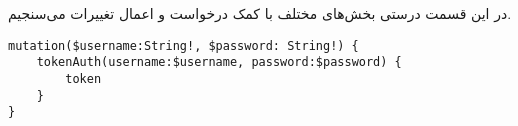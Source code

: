 
در این قسمت درستی بخش‌های مختلف  با کمک درخواست‌ و اعمال تغییرات  می‌سنجیم. 

	 


\begin{latin}
	\begin{verbatim}
mutation($username:String!, $password: String!) {
	tokenAuth(username:$username, password:$password) {
		token
	}
}
	\end{verbatim}
\end{latin}